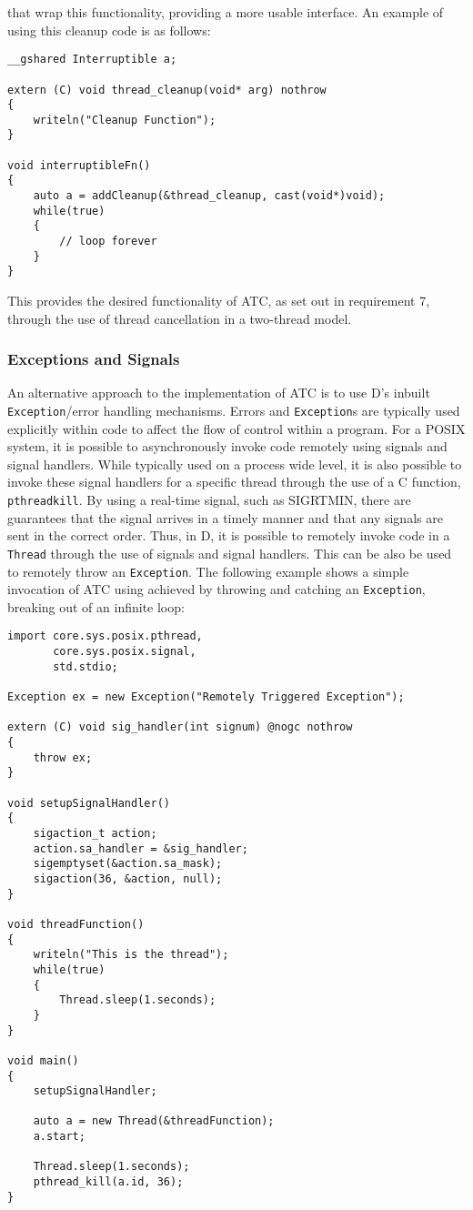 that wrap this functionality, providing a more usable interface. An example of using 
this cleanup code is as follows: 
\begin{lstlisting}
__gshared Interruptible a; 

extern (C) void thread_cleanup(void* arg) nothrow
{
    writeln("Cleanup Function");
}

void interruptibleFn()
{
    auto a = addCleanup(&thread_cleanup, cast(void*)void);
    while(true)
    {
        // loop forever
    }
}
\end{lstlisting}
This provides the desired functionality of ATC, as set out in requirement 7, 
through the use of thread cancellation in a two-thread model.

\subsubsection*{Exceptions and Signals}
An alternative approach to the implementation of ATC is to use D's inbuilt \texttt{Exception}/error 
handling mechanisms. Errors and \texttt{Exception}s are typically used explicitly within code 
to affect the flow of control within a program.
For a POSIX system, it is possible to asynchronously invoke code remotely using 
signals and signal handlers. While typically used on a process wide level, it
is also possible to invoke these signal handlers for a specific thread through
the use of a C function, \texttt{pthread\textunderscore{}kill}. By using a
real-time signal, such as SIGRTMIN, there are guarantees that the signal
arrives in a timely manner and that any signals are sent in the correct order. 
Thus, in D, it is possible to remotely invoke code in a \texttt{Thread} through 
the use of signals and signal handlers. This can be also be used to remotely
throw an \texttt{Exception}. The following example shows a simple invocation of ATC
using achieved by throwing and catching an \texttt{Exception}, breaking out of an
infinite loop: 
\begin{lstlisting}
import core.sys.posix.pthread, 
       core.sys.posix.signal, 
       std.stdio;

Exception ex = new Exception("Remotely Triggered Exception"); 

extern (C) void sig_handler(int signum) @nogc nothrow
{
    throw ex;
}

void setupSignalHandler()
{
    sigaction_t action; 
    action.sa_handler = &sig_handler; 
    sigemptyset(&action.sa_mask);
    sigaction(36, &action, null); 
}

void threadFunction()
{
    writeln("This is the thread"); 
    while(true)
    {
        Thread.sleep(1.seconds);
    }
}

void main()
{
    setupSignalHandler; 

    auto a = new Thread(&threadFunction); 
    a.start; 

    Thread.sleep(1.seconds); 
    pthread_kill(a.id, 36); 
}
\end{lstlisting}

